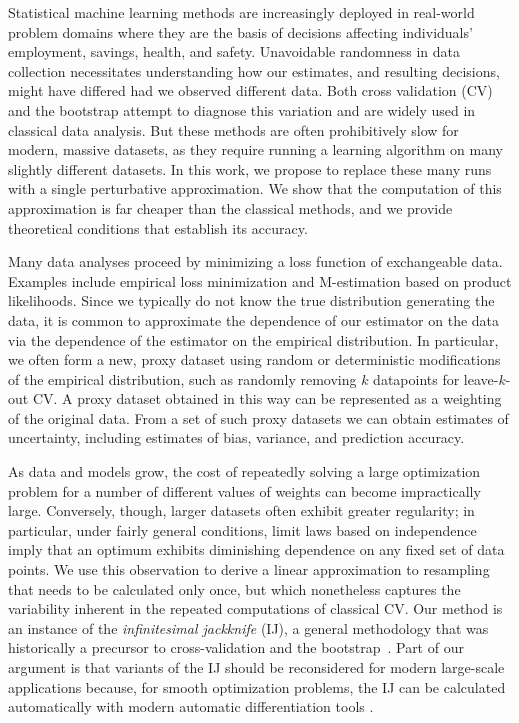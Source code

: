 
Statistical machine learning methods are increasingly deployed in real-world
problem domains where they are the basis of decisions affecting individuals'
employment, savings, health, and safety. Unavoidable randomness in data
collection necessitates understanding how our estimates, and resulting
decisions, might have differed had we observed different data. Both cross
validation (CV) and the bootstrap attempt to diagnose this variation and are
widely used in classical data analysis. But these methods are often
prohibitively slow for modern, massive datasets, as they require running a
learning algorithm on many slightly different datasets.  In this work, we
propose to replace these many runs with a single perturbative approximation. We
show that the computation of this approximation is far cheaper than the
classical methods, and we provide theoretical conditions that establish its
accuracy.

Many data analyses proceed by minimizing a loss function of exchangeable data.
Examples include empirical loss minimization and M-estimation based on product
likelihoods. Since we typically do not know the true distribution generating the
data, it is common to approximate the dependence of our estimator on the data
via the dependence of the estimator on the empirical distribution. In
particular, we often form a new, proxy dataset using random or deterministic
modifications of the empirical distribution, such as randomly removing $k$
datapoints for leave-$k$-out CV. A proxy dataset obtained in this way can be
represented as a weighting of the original data. From a set of such proxy
datasets we can obtain estimates of uncertainty, including estimates of bias,
variance, and prediction accuracy.

As data and models grow, the cost of repeatedly solving a large optimization
problem for a number of different values of weights can become impractically
large. Conversely, though, larger datasets often exhibit greater regularity; in
particular, under fairly general conditions, limit laws based on independence
imply that an optimum exhibits diminishing dependence on any fixed set of data
points.  We use this observation to derive a linear approximation to resampling
that needs to be calculated only once, but which nonetheless captures the
variability inherent in the repeated computations of classical CV.  Our method
is an instance of the \emph{infinitesimal jackknife} (IJ), a general methodology
that was historically a precursor to cross-validation and the
bootstrap~\citep{jaeckel:1972:infinitesimal, efron:1982:jackknife}. Part of our
argument is that variants of the IJ should be reconsidered
for modern large-scale applications because, for smooth optimization problems,
the IJ can be calculated automatically with modern
automatic differentiation tools \citep{baydin:2015:automatic}.

